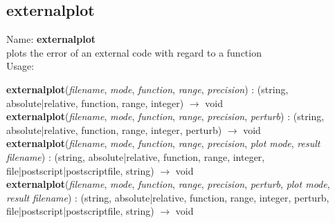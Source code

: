 \subsection{ externalplot }
\noindent Name: \textbf{externalplot}\\
plots the error of an external code with regard to a function\\

\noindent Usage: 
\begin{center}
\textbf{externalplot}(\emph{filename}, \emph{mode}, \emph{function}, \emph{range}, \emph{precision}) : (\textsf{string}, \textsf{absolute|relative}, \textsf{function}, \textsf{range}, \textsf{integer}) $\rightarrow$ \textsf{void}\\
\textbf{externalplot}(\emph{filename}, \emph{mode}, \emph{function}, \emph{range}, \emph{precision}, \emph{perturb}) : (\textsf{string}, \textsf{absolute|relative}, \textsf{function}, \textsf{range}, \textsf{integer}, \textsf{perturb}) $\rightarrow$ \textsf{void}\\
\textbf{externalplot}(\emph{filename}, \emph{mode}, \emph{function}, \emph{range}, \emph{precision}, \emph{plot mode}, \emph{result filename}) : (\textsf{string}, \textsf{absolute|relative}, \textsf{function}, \textsf{range}, \textsf{integer}, \textsf{file|postscript|postscriptfile}, \textsf{string}) $\rightarrow$ \textsf{void}\\
\textbf{externalplot}(\emph{filename}, \emph{mode}, \emph{function}, \emph{range}, \emph{precision}, \emph{perturb}, \emph{plot mode}, \emph{result filename}) : (\textsf{string}, \textsf{absolute|relative}, \textsf{function}, \textsf{range}, \textsf{integer}, \textsf{perturb}, \textsf{file|postscript|postscriptfile}, \textsf{string}) $\rightarrow$ \textsf{void}\\
\end{center}
